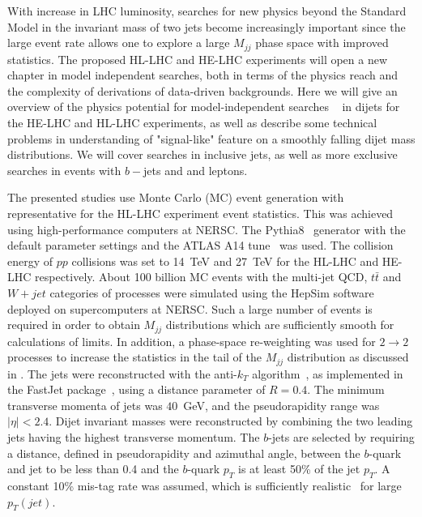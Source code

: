 With increase in LHC luminosity, searches for new physics beyond the Standard Model in the invariant mass of two jets become increasingly important since the large event rate allows one to explore a large $M_{jj}$ phase space with improved statistics.  The proposed HL-LHC and HE-LHC experiments will open a new chapter in model independent searches, both in  terms of the physics reach and the complexity of derivations of data-driven backgrounds. 
Here we will give an overview of the physics potential for model-independent searches ~\cite{Chekanov:2017pnx}  in dijets for the HE-LHC and HL-LHC experiments, as well as describe some technical problems in understanding of "signal-like" feature on a smoothly falling dijet mass distributions. 
We will cover searches in inclusive jets, as well as more exclusive searches in events with $b-$jets and and leptons. 

The presented studies use Monte Carlo (MC) event generation
with representative for the HL-LHC experiment event statistics. This  was achieved
using high-performance computers at NERSC. The Pythia8~\cite{Sjostrand:2007gs} generator with the default parameter settings and the ATLAS A14 tune~\cite{ATL-PHYS-PUB-2014-021} was used. The \com  collision energy of $pp$ collisions
was set to 14~TeV and 27~TeV for the HL-LHC and HE-LHC respectively.
About 100 billion MC events with the multi-jet QCD, $t\bar{t}$ and $W+jet$ categories of processes
were simulated using the HepSim software~\cite{Chekanov:2014fga} 
deployed on supercomputers at NERSC.
Such a large number of events is required in order to obtain $M_{jj}$ distributions 
which are sufficiently smooth for calculations of limits. In addition, a phase-space re-weighting was used for  $2\rightarrow 2$ processes to increase the statistics in the tail of the $M_{jj}$ distribution as discussed in . 
The jets were reconstructed with the anti-$k_T$ algorithm~\cite{Cacciari:2008gp}, as 
implemented in the FastJet package~\cite{Cacciari:2011ma}, using  a distance parameter of $R=0.4$.
The minimum transverse momenta of jets was $40$~GeV, and the pseudorapidity range  was $|\eta|<2.4$. Dijet invariant masses  were reconstructed by combining the two leading jets
having the highest transverse momentum. The $b$-jets are selected by requiring  a distance, defined in pseudorapidity and azimuthal angle,  between the $b$-quark and jet to be less than 0.4 and
the $b$-quark $p_{T}$ is at least 50\% of the jet $p_{T}$. 
A constant 10\% mis-tag rate was  assumed, which is sufficiently realistic~\cite{Aad:2015ydr} for large $p_T(jet)$.

